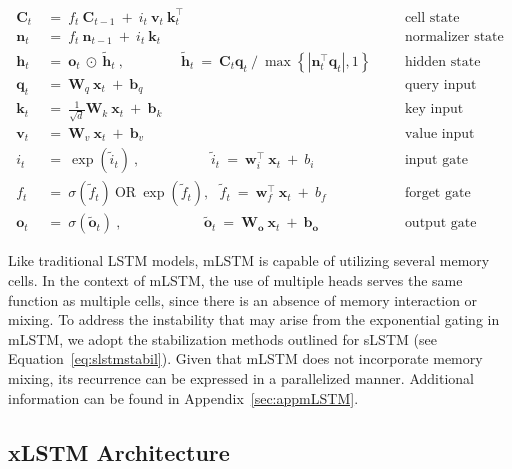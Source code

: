 \begin{align}
\label{eq:mlstm_recurrent_begin}
\mathbf{C}_t \ &= \  f_t \ \mathbf{C}_{t-1} \ + \ 
  i_t \ \mathbf{v}_t \ \mathbf{k}_t^\top & &  &\text{cell state} \\
\mathbf{n}_t \ &= \  f_t \ \mathbf{n}_{t-1} \ + \ 
  i_t \ \mathbf{k}_t & &  &\text{normalizer state} \\
\mathbf{h}_t  \ &= \ \mathbf{o}_t \ \odot \ \tilde{\mathbf{h}}_t
\ , \qquad \qquad 
\tilde{\mathbf{h}}_t \ = \   \mathbf{C}_t \mathbf{q}_t \ / \ 
  \max \left\{ |\mathbf{n}_t^\top \mathbf{q}_t|, 1 \right\} 
   &&&\text{hidden state} \\
\mathbf{q}_t \ &= \ \mathbf{W}_q \ \mathbf{x}_t \ + \ \mathbf{b}_q  & &  &\text{query input} \\
\mathbf{k}_t \ &= \ \frac{1}{\sqrt{d}} \mathbf{W}_k \ \mathbf{x}_t \ + \ \mathbf{b}_k  & &  &\text{key input} \\
\mathbf{v}_t \ &= \ \mathbf{W}_v \ \mathbf{x}_t \ + \ \mathbf{b}_v  & &  &\text{value input} \\
i_t \ &= \ \!\exp \!  \! \left( \tilde{i}_t  \right) \ , 
 \qquad \qquad \ \ \ \ \,
  \tilde{i}_t \ = \ \mathbf{w}^\top_{i} \ \mathbf{x}_t \ + \  b_{i} \ \ \ 
  &&&\text{input gate} \\
f_t \ &= \ \sigma \!  \left(  \tilde{f}_t \right) \ \text{OR} \ \!\exp \!  \! \left(  \tilde{f}_t \right) , \ \ \: \!
\tilde{f}_t \ = \ \mathbf{w}^\top_{f} \ \mathbf{x}_t  \ + \
  b_{f}
  &&& \text{forget gate} \\
\label{eq:mlstm_recurrent_end}
\mathbf{o}_t \ &= \ \sigma \left( \tilde{\mathbf{o}}_t \right) \ , \qquad \qquad \quad \ \ \ \,
  \tilde{\mathbf{o}}_t  \ = \ \mathbf{W}_{\mathbf{o}} \ \mathbf{x}_t \ + \
  \mathbf{b}_{\mathbf{o}}
  &&&\text{output gate} 
\end{align}

Like traditional LSTM models, mLSTM is capable of utilizing several memory cells. In the context of mLSTM, the use of multiple heads serves the same function as multiple cells, since there is an absence of memory interaction or mixing. To address the instability that may arise from the exponential gating in mLSTM, we adopt the stabilization methods outlined for sLSTM (see Equation~\ref{eq:slstmstabil}). Given that mLSTM does not incorporate memory mixing, its recurrence can be expressed in a parallelized manner. Additional information can be found in Appendix~\ref{sec:appmLSTM}.

\subsection{xLSTM Architecture}
\label{sec:xLSTMarch}

